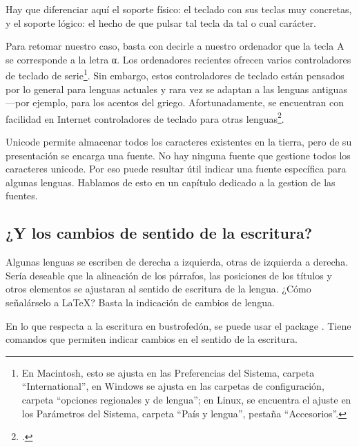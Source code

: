 Hay que diferenciar aquí el soporte físico: el teclado con sus teclas muy concretas, y el soporte lógico: el hecho de que pulsar tal tecla da tal o cual carácter. 

Para retomar nuestro caso, basta con decirle a nuestro ordenador que la tecla A se corresponde a la letra α. Los ordenadores recientes ofrecen varios controladores de teclado de serie\footnote{En Macintosh, esto se ajusta en las Preferencias del Sistema, carpeta \enquote{International}, en Windows se ajusta en las carpetas de configuración, carpeta \enquote{opciones regionales y de lengua}; en Linux, se encuentra el ajuste en los Parámetros del Sistema, carpeta \enquote{País y lengua}, pestaña \enquote{Accesorios}.}. Sin embargo, estos controladores de teclado están pensados por lo general para lenguas actuales y rara vez se adaptan a las lenguas antiguas ---por ejemplo, para los acentos del griego. Afortunadamente, se encuentran con facilidad en Internet controladores de teclado para otras lenguas\footcites[Por lo que respecta al griego antiguo, el siríaco, el hebreo antiguo, se pueden emplear los teclados propuestos por Michael Langlois:][]{clavierLanglois}[o también, para el griego, los teclados de la École Normale Supérieure][]{clavierENS}.

\begin{plusloins}
Unicode  permite almacenar todos los caracteres existentes en la tierra, pero de su presentación se encarga una fuente. No hay ninguna fuente que gestione todos los caracteres unicode. Por eso puede resultar útil indicar una fuente específica para algunas lenguas. Hablamos de esto en un capítulo dedicado a la gestion de las fuentes.
\end{plusloins}

\subsection{¿Y los cambios de sentido de la escritura?}

Algunas lenguas se escriben de derecha a izquierda, otras de izquierda a derecha. Sería deseable que la alineación de los párrafos, las posiciones de los títulos y otros elementos se ajustaran al sentido de escritura de la lengua. ¿Cómo señalárselo a \LaTeX{}? Basta la indicación de cambios de lengua. 

\begin{plusloins}
En lo que respecta a la escritura en bustrofedón, se puede usar el package . Tiene comandos que permiten indicar cambios en el sentido de la escritura. 
\end{plusloins}
